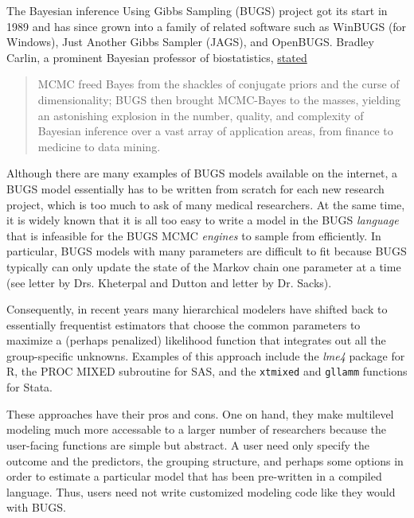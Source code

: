 \documentclass[11pt,notitlepage]{article}
\begin{document}
The Bayesian inference Using Gibbs Sampling (BUGS) project got its start in 1989 and has 
since grown into a family of related software such as WinBUGS (for Windows), Just Another
Gibbs Sampler (JAGS), and OpenBUGS. Bradley Carlin, a prominent Bayesian professor of biostatistics, 
\href{http://www.mrc-bsu.cam.ac.uk/software/bugs/the-bugs-project-the-bugs-book/the-bugs-book-reviews/}{stated}
\begin{quote}
MCMC freed Bayes from the shackles of conjugate priors and the curse of dimensionality; 
BUGS then brought MCMC-Bayes to the masses, yielding an astonishing explosion in the number, 
quality, and complexity of Bayesian inference over a vast array of application areas, from 
finance to medicine to data mining.
\end{quote}
Although there are many examples of BUGS models available on the internet, a BUGS model
essentially has to be written from scratch for each new research project, which is too much
to ask of many medical researchers. At the same time, it is widely known that it is all too easy to 
write a model in the BUGS \textit{language} that is infeasible for the BUGS MCMC \textit{engines} 
to sample from efficiently. In particular, BUGS models with many parameters are difficult to fit 
because BUGS typically can only update the state of the Markov chain one parameter at a time
(see letter by Drs. Kheterpal and Dutton and letter by Dr. Sacks).

Consequently, in recent years many hierarchical modelers have shifted back to essentially
frequentist estimators that choose the common parameters to maximize a (perhaps penalized) 
likelihood function that integrates out all the group-specific unknowns. Examples of this
approach include the \textit{lme4} package for R, the PROC MIXED subroutine for SAS, and
the \texttt{xtmixed} and \texttt{gllamm} functions for Stata. 

These approaches have their pros and cons. One on hand, they make multilevel modeling much more accessable to a larger number
of researchers because the user-facing functions are simple but abstract. A user need only specify the
outcome and the predictors, the grouping structure, and perhaps some options in order to estimate
a particular model that has been pre-written in a compiled language. Thus, users need not write customized 
modeling code like they would with BUGS.
\end{document}
